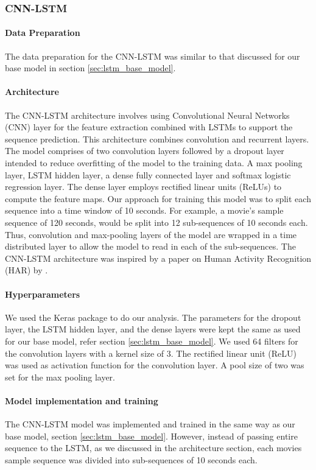 \subsubsection{CNN-LSTM}
\paragraph{Data Preparation} The data preparation for the CNN-LSTM was similar to that discussed for our base model in section \ref{sec:lstm_base_model}.

\paragraph{Architecture} The CNN-LSTM architecture involves using Convolutional Neural Networks (CNN) layer for the feature extraction combined with LSTMs to support the sequence prediction. This architecture combines convolution and recurrent layers. The model comprises of two convolution layers followed by a dropout layer intended to reduce overfitting of the model to the training data. A max pooling layer, LSTM hidden layer, a dense fully connected layer and softmax logistic regression layer. The dense layer employs rectified linear units (ReLUs) to compute the feature maps. Our approach for training this model was to split each sequence into a time window of 10 seconds. For example, a movie's sample sequence of 120 seconds, would be split into 12 sub-sequences of 10 seconds each. Thus, convolution and max-pooling layers of the model are wrapped in a time distributed layer to allow the model to read in each of the sub-sequences. The CNN-LSTM architecture was inspired by a paper on Human Activity Recognition (HAR) by \citeauthor{ordonez_deep_2016} \cite{ordonez_deep_2016}. 

\paragraph{Hyperparameters} We used the Keras \cite{keras} package to do our analysis. The parameters for the dropout layer, the LSTM hidden layer, and the dense layers were kept the same as used for our base model, refer section \ref{sec:lstm_base_model}. We used 64 filters for the convolution layers with a kernel size of 3. The rectified linear unit (ReLU) was used as activation function for the convolution layer. A pool size of two was set for the max pooling layer.

\paragraph{Model implementation and training} The CNN-LSTM model was implemented and trained in the same way as our base model, section \ref{sec:lstm_base_model}. However, instead of passing entire sequence to the LSTM, as we discussed in the architecture section, each movies sample sequence was divided into sub-sequences of 10 seconds each.

